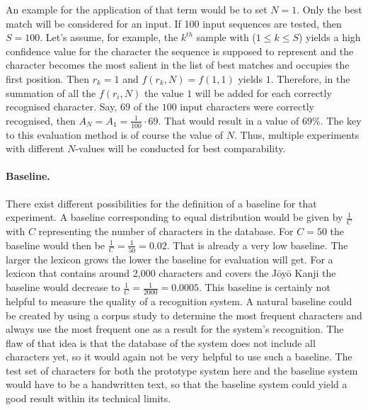 An example for the application of that term would be to set \(N = 1\).
Only the best match will be considered for an input.
If 100 input sequences are tested, then \(S=100\). 
Let's assume, for example, the \(k^{th}\) sample with (\(1 \leq k \leq S\)) 
yields a high confidence value for the character the sequence is supposed 
to represent and the character becomes the most salient in the list of 
best matches and occupies the first position. 
Then \(r_{k} = 1\) and \(f(r_{k},N) = f(1,1)\) yields \(1\).
Therefore, in the summation of all the \(f(r_{i},N)\) the value \(1\) 
will be added for each correctly recognised character.
Say, \(69\) of the \(100\) input characters were correctly recognised,
then \(A_{N} = A_{1} = \frac{1}{100} \cdot 69\). That would result in a value 
of \(69\%\). The key to this evaluation method is of course the 
value of \(N\). Thus, multiple experiments with different \(N\)-values will be 
conducted for best comparability.

\paragraph{Baseline.} There exist different possibilities for the definition of a 
baseline for that experiment. A baseline corresponding to equal distribution 
would be given by \(\frac{1}{C}\) with \(C\) representing the number of 
characters in the database. 
For \(C = 50\) the baseline would then be \(\frac{1}{C} = \frac{1}{50} = 0.02\).
That is already a very low baseline. The larger the lexicon grows the
lower the baseline for evaluation will get. 
For a lexicon that contains around 2,000 
characters and covers the Jōyō Kanji the baseline would decrease to
\(\frac{1}{C} = \frac{1}{2000} = 0.0005\).
This baseline is certainly not helpful to measure the quality of a 
recognition system. A natural baseline could be created by using 
a corpus study to determine the most frequent characters and always use
the most frequent one as a result for the system's recognition.
The flaw of that idea is that the database of the system does not
include all characters yet, so it would again not be very helpful to use
such a baseline. The test set of characters for both the prototype
system here and the baseline system would have to be 
a handwritten text, so that the baseline system could yield a good result
within its technical limits.

